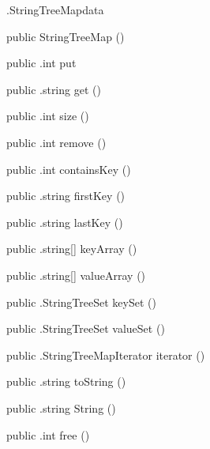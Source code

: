 \begin{CrexxClass}{.StringTreeMap}{data}

  \begin{Hierarchy}
  \end{Hierarchy}

  \begin{Members}

    \Factory
      {public}
      {StringTreeMap}
      {()}

    \Method
      {public}
      {.int}
      {put}
      {}

    \Method
      {public}
      {.string}
      {get}
      {()}

    \Method
      {public}
      {.int}
      {size}
      {()}

    \Method
      {public}
      {.int}
      {remove}
      {()}

    \Method
      {public}
      {.int}
      {containsKey}
      {()}

    \Method
      {public}
      {.string}
      {firstKey}
      {()}

    \Method
      {public}
      {.string}
      {lastKey}
      {()}

    \Method
      {public}
      {.string[]}
      {keyArray}
      {()}

    \Method
      {public}
      {.string[]}
      {valueArray}
      {()}

    \Method
      {public}
      {.StringTreeSet}
      {keySet}
      {()}

    \Method
      {public}
      {.StringTreeSet}
      {valueSet}
      {()}

    \Method
      {public}
      {.StringTreeMapIterator}
      {iterator}
      {()}

    \Method
      {public}
      {.string}
      {toString}
      {()}

    \Method
      {public}
      {.string}
      {String}
      {()}

    \Method
      {public}
      {.int}
      {free}
      {()}

  \end{Members}
\end{CrexxClass}

